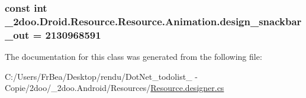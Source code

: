 \hypertarget{class__2doo_1_1_droid_1_1_resource_1_1_animation_1961127b3aa94a9ef1583c626212cab0}{
\subsubsection[{design\_\-snackbar\_\-out}]{\setlength{\rightskip}{0pt plus 5cm}const int \_\-2doo.Droid.Resource.Resource.Animation.design\_\-snackbar\_\-out = 2130968591}}
\label{class__2doo_1_1_droid_1_1_resource_1_1_animation_1961127b3aa94a9ef1583c626212cab0}




The documentation for this class was generated from the following file:\begin{CompactItemize}
\item 
C:/Users/FrBea/Desktop/rendu/DotNet\_\-todolist\_ - Copie/2doo/\_\-2doo.Android/Resources/\hyperlink{_resource_8designer_8cs}{Resource.designer.cs}\end{CompactItemize}
